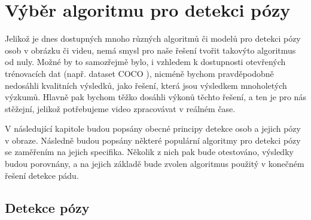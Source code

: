 \chapter{Výběr algoritmu pro detekci pózy}
\label{sec:Pose}

Jelikož je dnes dostupných mnoho různých algoritmů či modelů pro detekci pózy
osob v obrázku či videu, nemá smysl pro naše řešení tvořit takovýto algoritmus
od nuly. Možné by to samozřejmě bylo, i vzhledem k dostupnosti otevřených
trénovacích dat (např. dataset COCO \cite{coco}), nicméně bychom pravděpodobně
nedosáhli kvalitních výsledků, jako řešení, která jsou výsledkem mnoholetých
výzkumů. Hlavně pak bychom těžko dosáhli výkonů těchto řešení, a ten je pro nás
stěžejní, jelikož potřebujeme video zpracovávat v reálném čase.

V následující kapitole budou popsány obecné principy detekce osob a jejich pózy
v obraze. Následně budou popsány některé populární algoritmy pro detekci pózy
se zaměřením na jejich specifika. Několik z nich pak bude otestováno, výsledky
budou porovnány, a na jejich základě bude zvolen algoritmus použitý v konečném
řešení detekce pádu.

\section{Detekce pózy}

